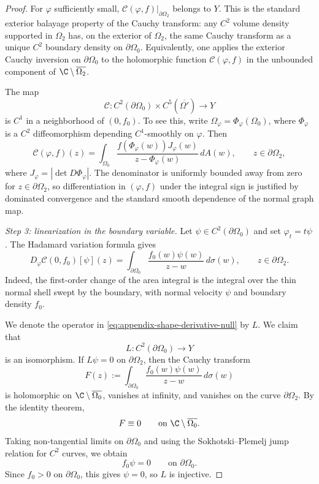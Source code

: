 \begin{proof}
For \(\varphi\) sufficiently small, \(\mathcal C(\varphi,f)|_{\partial\Omega_2}\)
belongs to \(Y\). This is the standard exterior balayage property of the
Cauchy transform: any \(C^2\) volume density supported in \(\Omega_2\) has, on
the exterior of \(\Omega_2\), the same Cauchy transform as a unique \(C^2\)
boundary density on \(\partial\Omega_0\). Equivalently, one applies the
exterior Cauchy inversion on \(\partial\Omega_0\) to the holomorphic function
\(\mathcal C(\varphi,f)\) in the unbounded component of
\(\C\setminus\overline{\Omega_2}\).

The map
\[
\mathcal C:
C^2(\partial\Omega_0)\times C^5(\overline{\Omega'})
\longrightarrow Y
\]
is \(C^1\) in a neighborhood of \((0,f_0)\). To see this, write
\(\Omega_\varphi=\Phi_\varphi(\Omega_0)\), where \(\Phi_\varphi\) is a
\(C^2\) diffeomorphism depending \(C^1\)-smoothly on \(\varphi\). Then
\[
\mathcal C(\varphi,f)(z)
=
\int_{\Omega_0}
\frac{f(\Phi_\varphi(w))J_\varphi(w)}{z-\Phi_\varphi(w)}\,dA(w),
\qquad z\in\partial\Omega_2 ,
\]
where \(J_\varphi=|\det D\Phi_\varphi|\). The denominator is uniformly bounded
away from zero for \(z\in\partial\Omega_2\), so differentiation in
\((\varphi,f)\) under the integral sign is justified by dominated convergence
and the standard smooth dependence of the normal graph map.

\medskip
\noindent\emph{Step 3: linearization in the boundary variable.}
Let \(\psi\in C^2(\partial\Omega_0)\) and set \(\varphi_t=t\psi\). The
Hadamard variation formula gives
\begin{equation}\label{eq:appendix-shape-derivative-null}
D_\varphi\mathcal C(0,f_0)[\psi](z)
=
\int_{\partial\Omega_0}
\frac{f_0(w)\psi(w)}{z-w}\,d\sigma(w),
\qquad z\in\partial\Omega_2 .
\end{equation}
Indeed, the first-order change of the area integral is the integral over the
thin normal shell swept by the boundary, with normal velocity \(\psi\) and
boundary density \(f_0\).

We denote the operator in \eqref{eq:appendix-shape-derivative-null} by \(L\).
We claim that
\[
L:C^2(\partial\Omega_0)\longrightarrow Y
\]
is an isomorphism. If \(L\psi=0\) on \(\partial\Omega_2\), then the Cauchy
transform
\[
F(z):=\int_{\partial\Omega_0}
\frac{f_0(w)\psi(w)}{z-w}\,d\sigma(w)
\]
is holomorphic on \(\C\setminus\overline{\Omega_0}\), vanishes at infinity,
and vanishes on the curve \(\partial\Omega_2\). By the identity theorem,
\[
F\equiv0
\qquad\text{on }\C\setminus\overline{\Omega_0}.
\]
Taking non-tangential limits on \(\partial\Omega_0\) and using the
Sokhotski--Plemelj jump relation for \(C^2\) curves, we obtain
\[
f_0\psi=0
\qquad\text{on }\partial\Omega_0 .
\]
Since \(f_0>0\) on \(\partial\Omega_0\), this gives \(\psi=0\), so \(L\) is
injective.


\end{proof}
